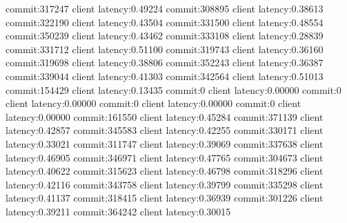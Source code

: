 commit:317247 client latency:0.49224
commit:308895 client latency:0.38613
commit:322190 client latency:0.43504
commit:331500 client latency:0.48554
commit:350239 client latency:0.43462
commit:333108 client latency:0.28839
commit:331712 client latency:0.51100
commit:319743 client latency:0.36160
commit:319698 client latency:0.38806
commit:352243 client latency:0.36387
commit:339044 client latency:0.41303
commit:342564 client latency:0.51013
commit:154429 client latency:0.13435
commit:0 client latency:0.00000
commit:0 client latency:0.00000
commit:0 client latency:0.00000
commit:0 client latency:0.00000
commit:161550 client latency:0.45284
commit:371139 client latency:0.42857
commit:345583 client latency:0.42255
commit:330171 client latency:0.33021
commit:311747 client latency:0.39069
commit:337638 client latency:0.46905
commit:346971 client latency:0.47765
commit:304673 client latency:0.40622
commit:315623 client latency:0.46798
commit:318296 client latency:0.42116
commit:343758 client latency:0.39799
commit:335298 client latency:0.41137
commit:318415 client latency:0.36939
commit:301226 client latency:0.39211
commit:364242 client latency:0.30015